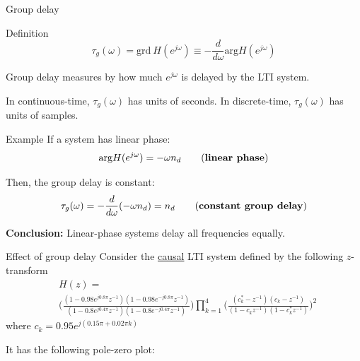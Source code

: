 \documentclass[10pt]{beamer}
\begin{document}
%
\begin{frame}{Group delay}
	\begin{block}{Definition}
		\begin{equation*}
			\tau_g(\omega) = \mathrm{grd}~ H(e^{j\omega}) \equiv -\dfrac{d}{d\omega}\mathrm{arg} H(e^{j\omega}) \tag{group delay}
		\end{equation*}
		
		Group delay measures by how much $e^{j\omega}$ is delayed by the LTI system. 
		
		In continuous-time, $\tau_g(\omega)$ has units of seconds. In discrete-time, $\tau_g(\omega)$ has units of samples.
	\end{block}
	
	\begin{block}{Example}
		If a system has linear phase:
		\begin{equation*}
			\mathrm{arg} H(e^{j\omega}) = -\omega n_d \tag{\textbf{linear phase}}
		\end{equation*} 
		
		Then, the group delay is constant:
		\begin{equation*}
		\tau_g(\omega) = -\dfrac{d}{d\omega}(-\omega n_d) = n_d \tag{\textbf{constant group delay}}
		\end{equation*} 
		
		\textbf{Conclusion:} Linear-phase systems delay all frequencies equally.	
	\end{block}
\end{frame}


\begin{frame}{Effect of group delay}
	Consider the \underline{causal} LTI system defined by the following $z$-transform
	\begin{align*}
	&H(z) = \\ &\bigg(\frac{(1-0.98e^{j0.8\pi}z^{-1})(1-0.98e^{-j0.8\pi}z^{-1})}{(1-0.8e^{j0.4\pi}z^{-1})(1-0.8e^{-j0.4\pi}z^{-1})}\bigg)\prod_{k=1}^4\bigg(\frac{(c_k^* -z^{-1})(c_k -z^{-1})}{(1 -c_kz^{-1})(1 -c_k^*z^{-1})}\bigg)^2
	\end{align*}
	where $c_k = 0.95e^{j(0.15\pi + 0.02\pi k)}$
	
	It has the following pole-zero plot:
	
	\begin{center}
		\resizebox{0.5\linewidth}{!}{}
	\end{center}
\end{frame}
\end{document}
